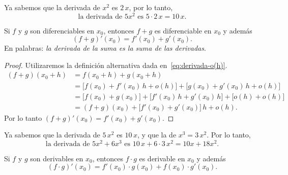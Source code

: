 \begin{example}
    Ya sabemos que la derivada de $x^2$ es $2\, x$, por lo tanto, 
    \[
    \text{la derivada de $5 x^2$ es  $5 \cdot 2 \, x = 10\,  x$.}
    \]
\end{example}

\begin{proposition}
    Si $f$ y $g$ son diferenciables en $x_0$, entonces $f+g$ es diferenciable en $x_0$ y además
    \[
    (f+g)'(x_0) = f'(x_0)+g'(x_0).
    \]
    En palabras: \emph{la derivada de la suma es la suma de las derivadas}.
\end{proposition}

\begin{proof}
Utilizaremos la definición alternativa dada en~\eqref{eq:derivada-o(h)}.
\begin{align*}
    (f+g)(x_0+h) 
    &= f(x_0+h)+g(x_0+h)
    \\
    &= \big[f(x_0)+f'(x_0)\, h + o(h)\big]
    + \big[g(x_0)+g'(x_0)\, h + o(h)\big]
    \\
    &= \big[f(x_0)+g(x_0)\big] +
    \big[f'(x_0)\, h + g'(x_0)\, h\big] 
    + \big[o(h)+ o(h)\big]
    \\
    &= (f+g)(x_0) +
    \big[f'(x_0)+ g'(x_0)\big] \, h
    + o(h).
\end{align*}
Por lo tanto $(f+g)'(x_0) = f'(x_0)+g'(x_0)$.
\end{proof}

\begin{example}
    Ya sabemos que la derivada de $5 \,x^2$ es $10\,x$, y que la de $x^3 = 3\, x^2$.
    Por lo tanto, 
    \[
    \text{la derivada de $5 x^2 + 6 x^3$ es $10 \, x + 6 \cdot 3 \, x^2 = 10 x + 18 x^2$.}
    \]
\end{example}

\begin{proposition}\label{P:derivada del producto}
    Si $f$ y $g$ son derivables en $x_0$, entonces $f\cdot g$ es derivable en $x_0$ y además
    \[
    (f\cdot g)'(x_0) = f'(x_0)\cdot g(x_0)+f(x_0)\cdot g'(x_0).
    \]
\end{proposition}

